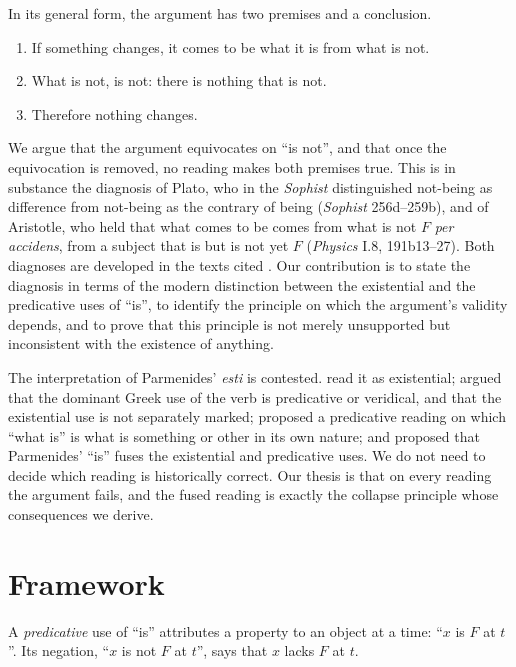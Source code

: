 \documentclass{situationist-preprint}
\begin{document}
In its general form, the argument has two premises and a conclusion.
\begin{enumerate}[label=(\arabic*)]
\item If something changes, it comes to be what it is from what is not.
\item What is not, is not: there is nothing that is not.
\item Therefore nothing changes.
\end{enumerate}

We argue that the argument equivocates on \enquote{is not}, and that once the equivocation is removed, no reading makes both premises true. This is in substance the diagnosis of Plato, who in the \emph{Sophist} distinguished not-being as difference from not-being as the contrary of being (\emph{Sophist} 256d--259b), and of Aristotle, who held that what comes to be comes from what is not $F$ \emph{per accidens}, from a subject that is but is not yet $F$ (\emph{Physics} I.8, 191b13--27). Both diagnoses are developed in the texts cited \citep{PlatoSoph,AristotlePhys}. Our contribution is to state the diagnosis in terms of the modern distinction between the existential and the predicative uses of \enquote{is}, to identify the principle on which the argument's validity depends, and to prove that this principle is not merely unsupported but inconsistent with the existence of anything.

The interpretation of Parmenides' \emph{esti} is contested. \citet{Owen1960} read it as existential; \citet{Kahn1966,Kahn1973} argued that the dominant Greek use of the verb is predicative or veridical, and that the existential use is not separately marked; \citet{Mourelatos1970} proposed a predicative reading on which \enquote{what is} is what is something or other in its own nature; and \citet{Furth1968} proposed that Parmenides' \enquote{is} fuses the existential and predicative uses. We do not need to decide which reading is historically correct. Our thesis is that on every reading the argument fails, and the fused reading is exactly the collapse principle whose consequences we derive.

\section{Framework}

\begin{definition}\label{d:pred}
A \emph{predicative} use of \enquote{is} attributes a property to an object at a time: \enquote{$x$ is $F$ at $t$}. Its negation, \enquote{$x$ is not $F$ at $t$}, says that $x$ lacks $F$ at $t$.
\end{definition}
\end{document}
